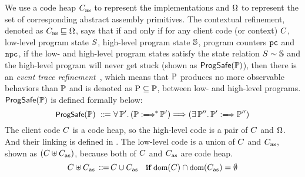 We use a code heap $C_{\text{as}}$
to represent the implementations
 and $\Omega$ to represent the set of corresponding 
abstract assembly primitives. 
The contextual refinement, 
denoted as $C_{\text{as}} \sqsubseteq \Omega$, 
says that if and only if for any client code 
(or context) $C$, low-level program 
state $S$, high-level program state $\mathbb{S}$, program counters 
$\texttt{pc}$ and $\texttt{npc}$, if the low- and high-level program states satisfy the 
state relation ${S} \sim {\mathbb{S}}$ and the high-level program 
will never get stuck (shown as $\textsf{ProgSafe}(\mathbb{P})$), 
then there is an {\it event trace refinement}~\cite{liang14lics}, 
which means that $\text{P}$ produces no more observable behaviors 
than $\mathbb{P}$ and is denoted as $\text{P} \subseteq \mathbb{P}$,  
between low- and high-level programs. $\textsf{ProgSafe}(\mathbb{P})$ 
is defined formally below: 
\[
    \small
    \progsafe(\HProg) \ \define \ 
    \forall \, \HProg'. \, 
    (\HGlobMultiTrans{\HProg}{}{*}{\HProg'}) 
    \Longrightarrow 
    (\exists \, \HProg''. \, 
        \HGlobTrans{\HProg'}{}{\HProg''})
\]
{\color{blue}
The client code $C$ is a \sparc{} code heap, so 
the high-level code is a pair of $C$ and $\Omega$. 
And their linking is defined in 
\Fig{\ref{fig:selected-opsem-high-level-prog}}. 
The low-level code is a union of $C$ and $C_{\text{as}}$, 
shown as $(C\uplus C_{\text{as}})$, because both of 
$C$ and $C_{\text{as}}$ are \sparc{} code heap.
\[
    \small
    C \uplus C_{\text{as}} \,::\!\!{=}\,
    C \cup C_{\text{as}} \quad
    \textbf{if} \ \text{dom}(C)\cap\text{dom}(C_{\text{as}}) = \emptyset
\] 
}

